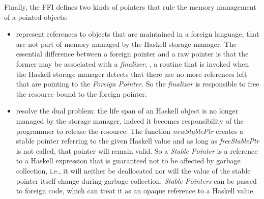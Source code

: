 Finally, the FFI defines two kinds of pointers that rule the memory management of a pointed objects:
\begin{itemize}
\item {} represent references to objects that are maintained in a foreign language, \ie that are not part of memory managed by the Haskell storage manager.
The essential difference between a foreign pointer and a raw pointer is that the former may be associated with a \emph{finalizer}, \ie, a routine that is invoked when the Haskell storage manager detects that there are no more references left that are pointing to the \emph{Foreign Pointer}.
So the \emph{finalizer} is responsible to free the resource bound to the foreign pointer. 

\item {} resolve the dual problem: the life span of an Haskell object is no longer managed by the storage manager, indeed it becomes responsibility of the programmer to release the resource.
The function \emph{newStablePtr} creates a stable pointer referring to the given Haskell value and as long as \emph{freeStablePtr} is not called, that pointer will remain valid.
So a \emph{Stable Pointer} is a reference to a Haskell expression that is guaranteed not to be affected by garbage collection, i.e., it will neither be deallocated nor will the value of the stable pointer itself change during garbage collection. \emph{Stable Pointers} can be passed to foreign code, which can treat it as an opaque reference to a Haskell value. 
\end{itemize}